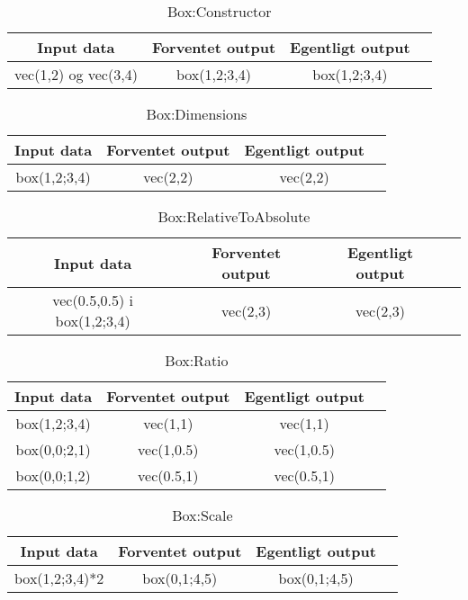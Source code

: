 \begin{table}[ht]
	\caption{Box:Constructor}
	\centering
	\begin{tabular}{c c c c}
		\hline\hline
		Input data & Forventet output & Egentligt output \\ [0.5ex]
		\hline
		vec(1,2) og vec(3,4) & box(1,2;3,4) & box(1,2;3,4)\\
		\hline
	\end{tabular}
	\label{table:boxConstructor}
\end{table}

\begin{table}[ht]
	\caption{Box:Dimensions}
	\centering
	\begin{tabular}{c c c c}
		\hline\hline
		Input data & Forventet output & Egentligt output \\ [0.5ex]
		\hline
		box(1,2;3,4) & vec(2,2) & vec(2,2)\\
		\hline
	\end{tabular}
	\label{table:boxDimensions}
\end{table}

\begin{table}[ht]
	\caption{Box:RelativeToAbsolute}
	\centering
	\begin{tabular}{c c c c}
		\hline\hline
		Input data & Forventet output & Egentligt output \\ [0.5ex]
		\hline
		vec(0.5,0.5) i box(1,2;3,4) & vec(2,3) & vec(2,3)\\
		\hline
	\end{tabular}
	\label{table:boxRelativeToAbsolute}
\end{table}

\begin{table}[ht]
	\caption{Box:Ratio}
	\centering
	\begin{tabular}{c c c c}
		\hline\hline
		Input data & Forventet output & Egentligt output \\ [0.5ex]
		\hline
		box(1,2;3,4) & vec(1,1) & vec(1,1)\\
		box(0,0;2,1) & vec(1,0.5) & vec(1,0.5)\\
		box(0,0;1,2) & vec(0.5,1) & vec(0.5,1)\\
		\hline
	\end{tabular}
	\label{table:boxRatio}
\end{table}

\begin{table}[ht]
	\caption{Box:Scale}
	\centering
	\begin{tabular}{c c c c}
		\hline\hline
		Input data & Forventet output & Egentligt output \\ [0.5ex]
		\hline
		box(1,2;3,4)*2 & box(0,1;4,5) & box(0,1;4,5)\\
		\hline
	\end{tabular}
	\label{table:boxScale}
\end{table}

